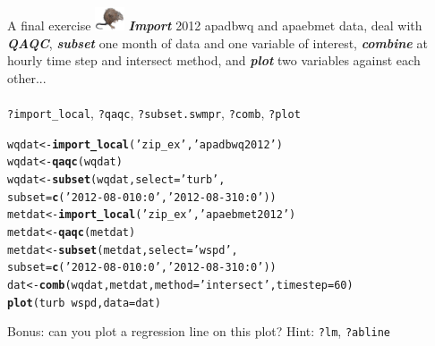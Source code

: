 \documentclass[xcolor=dvipsnames,serif]{beamer}\usepackage[]{graphicx}\usepackage[]{color}
\makeatletter
\newcommand{\hlnum}[1]{\textcolor[rgb]{0.686,0.059,0.569}{#1}}%
\newcommand{\hlstr}[1]{\textcolor[rgb]{0.192,0.494,0.8}{#1}}%
\newcommand{\hlopt}[1]{\textcolor[rgb]{0,0,0}{#1}}%
\newcommand{\hlstd}[1]{\textcolor[rgb]{0.345,0.345,0.345}{#1}}%
\newcommand{\hlkwb}[1]{\textcolor[rgb]{0.69,0.353,0.396}{#1}}%
\newcommand{\hlkwc}[1]{\textcolor[rgb]{0.333,0.667,0.333}{#1}}%
\newcommand{\hlkwd}[1]{\textcolor[rgb]{0.737,0.353,0.396}{\textbf{#1}}}%
\newenvironment{kframe}{%
 \def\at@end@of@kframe{}%
 \ifinner\ifhmode%
  \def\at@end@of@kframe{\end{minipage}}%
  \begin{minipage}{\columnwidth}%
 \fi\fi%
 \def\FrameCommand##1{\hskip\@totalleftmargin \hskip-\fboxsep
 \colorbox{shadecolor}{##1}\hskip-\fboxsep
     \hskip-\linewidth \hskip-\@totalleftmargin \hskip\columnwidth}%
 \MakeFramed {\advance\hsize-\width
   \@totalleftmargin\z@ \linewidth\hsize
   \@setminipage}}%
 {\par\unskip\endMakeFramed%
 \at@end@of@kframe}
\newenvironment{knitrout}{}{} %
\newcommand{\Bigtxt}[1]{\textbf{\textit{#1}}}
\makeatother
\begin{document}
\begin{frame}[fragile]{A final exercise \includegraphics[width = 0.065\textwidth]{imgs/swmprat.png}}
\onslide<+->
\Bigtxt{Import} 2012 apadbwq and apaebmet data, deal with \Bigtxt{QAQC}, \Bigtxt{subset} one month of data and one variable of interest, \Bigtxt{combine} at hourly time step and intersect method, and \Bigtxt{plot} two variables against each other... \\~\\
\onslide<+->
\texttt{?import\_local}, \texttt{?qaqc}, \texttt{?subset.swmpr}, \texttt{?comb}, \texttt{?plot}
\onslide<+->
\begin{knitrout}\scriptsize
{}\color{fgcolor}\begin{kframe}
\begin{alltt}
\hlstd{wqdat} \hlkwb{<-} \hlkwd{import_local}\hlstd{(}\hlstr{'zip_ex'}\hlstd{,} \hlstr{'apadbwq2012'}\hlstd{)}
\hlstd{wqdat} \hlkwb{<-} \hlkwd{qaqc}\hlstd{(wqdat)}
\hlstd{wqdat} \hlkwb{<-} \hlkwd{subset}\hlstd{(wqdat,} \hlkwc{select} \hlstd{=} \hlstr{'turb'}\hlstd{,}
  \hlkwc{subset} \hlstd{=} \hlkwd{c}\hlstd{(}\hlstr{'2012-08-01 0:0'}\hlstd{,} \hlstr{'2012-08-31 0:0'}\hlstd{))}
\hlstd{metdat} \hlkwb{<-} \hlkwd{import_local}\hlstd{(}\hlstr{'zip_ex'}\hlstd{,} \hlstr{'apaebmet2012'}\hlstd{)}
\hlstd{metdat} \hlkwb{<-} \hlkwd{qaqc}\hlstd{(metdat)}
\hlstd{metdat} \hlkwb{<-} \hlkwd{subset}\hlstd{(metdat,} \hlkwc{select} \hlstd{=} \hlstr{'wspd'}\hlstd{,}
 \hlkwc{subset} \hlstd{=} \hlkwd{c}\hlstd{(}\hlstr{'2012-08-01 0:0'}\hlstd{,} \hlstr{'2012-08-31 0:0'}\hlstd{))}
\hlstd{dat} \hlkwb{<-} \hlkwd{comb}\hlstd{(wqdat, metdat,} \hlkwc{method} \hlstd{=} \hlstr{'intersect'}\hlstd{,} \hlkwc{timestep} \hlstd{=} \hlnum{60}\hlstd{)}
\hlkwd{plot}\hlstd{(turb} \hlopt{~} \hlstd{wspd,} \hlkwc{data} \hlstd{= dat)}
\end{alltt}
\end{kframe}
\end{knitrout}
\onslide<+->
Bonus: can you plot a regression line on this plot? Hint: \texttt{?lm}, \texttt{?abline}
\end{frame}

\end{document}
